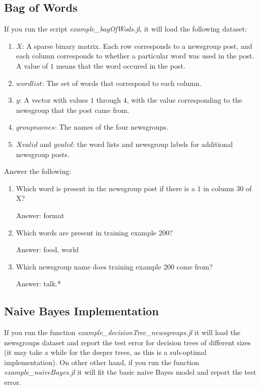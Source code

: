 \documentclass{article}
\def\ans#1{\par\gre{Answer: #1}}
\def\blu#1{{\color{blu}#1}}
\def\gre#1{{\color{gre}#1}}
\def\enum#1{\begin{enumerate}#1\end{enumerate}}
\begin{document}
\subsection{Bag of Words}

If you run the script \emph{example\_bagOfWods.jl}, it will load the following dataset:
\enum{
\item $X$: A sparse binary matrix. Each row corresponds to a newsgroup post, and each column corresponds to whether a particular word was used in the post. A value of $1$ means that the word occured in the post.
\item $wordlist$: The set of words that correspond to each column.
\item $y$: A vector with values $1$ through $4$, with the value corresponding to the newsgroup that the post came from.
\item $groupnames$: The names of the four newsgroups.
\item $Xvalid$ and $yvalid$: the word lists and newsgroup labels for additional newsgroup posts.
}
\blu{Answer the following}:
\enum{
\item Which word is present in the newsgroup post if there is a $1$ in column 30 of X? \ans{format}
\item Which words are present in training example 200? \ans{food, world}
\item Which newsgroup name does training example 200 come from? \ans{talk.*}
}

\subsection{Naive Bayes Implementation}

If you run the function \emph{example\_decisionTree\_newsgroups.jl} it will load the newsgroups dataset and report the test error for decision trees of different sizes (it may take a while for the deeper trees, as this is a sub-optimal implementation). On other other hand, if you run the function \emph{example\_naiveBayes.jl} it will fit the basic naive Bayes model and report the test error.
\end{document}
